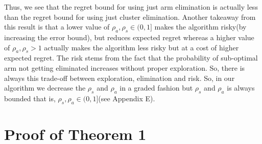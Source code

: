 \begin{remark}
\label{App:B:Rem:2}
Thus, we see that the regret bound for using just arm elimination is actually less than the regret bound for using just cluster elimination. Another takeaway from this result is that a lower value of $\rho_{a},\rho_{s}\in (0,1]$ makes the algorithm risky(by increasing the error bound), but reduces expected regret whereas a higher value of $\rho_{a},\rho_{s} > 1$ actually makes the algorithm less risky but at a cost of higher expected regret. The risk stems from the fact that the probability of sub-optimal arm not getting eliminated increases without proper exploration. So, there is always this trade-off between exploration, elimination and risk. So, in our algorithm we decrease the $\rho_{s}$ and $\rho_{a}$ in a graded fashion but $\rho_{s}$ and $\rho_{a}$ is always bounded that is, $\rho_{s},\rho_{a} \in (0,1]$(see Appendix E).
\end{remark}



\section{Proof of Theorem 1}
\label{App:C}

